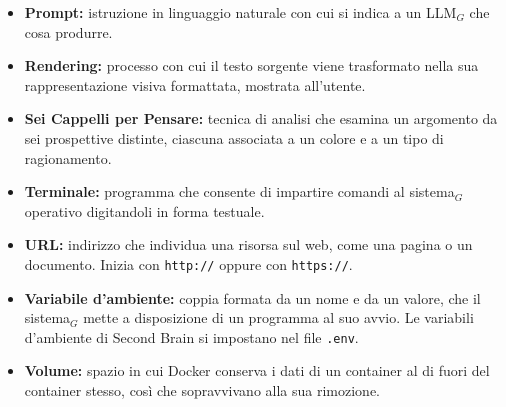 \documentclass[a4paper, 10pt]{article}
\begin{document}
\begin{itemize}
    \item \textbf{Prompt:}
istruzione in linguaggio naturale con cui si indica a un LLM$_G$ che cosa produrre.

    \item \textbf{Rendering:}
processo con cui il testo sorgente viene trasformato nella sua rappresentazione visiva formattata, mostrata all'utente.

    \item \textbf{Sei Cappelli per Pensare:}
tecnica di analisi che esamina un argomento da sei prospettive distinte, ciascuna associata a un colore e a un tipo di ragionamento.

    \item \textbf{Terminale:}
programma che consente di impartire comandi al sistema$_G$ operativo digitandoli in forma testuale.

    \item \textbf{URL:}
indirizzo che individua una risorsa sul web, come una pagina o un documento. Inizia con \texttt{http://} oppure con \texttt{https://}.

    \item \textbf{Variabile d'ambiente:}
coppia formata da un nome e da un valore, che il sistema$_G$ mette a disposizione di un programma al suo avvio. Le variabili d'ambiente di Second Brain si impostano nel file \texttt{.env}.

    \item \textbf{Volume:}
spazio in cui Docker conserva i dati di un container al di fuori del container stesso, così che sopravvivano alla sua rimozione.
\end{itemize}
\end{document}
